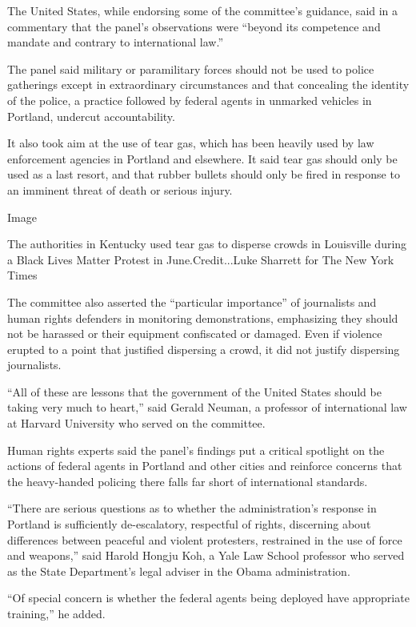 The United States, while endorsing some of the committee's guidance,
said in a commentary that the panel's observations were ``beyond its
competence and mandate and contrary to international law.''

The panel said military or paramilitary forces should not be used to
police gatherings except in extraordinary circumstances and that
concealing the identity of the police, a practice followed by federal
agents in unmarked vehicles in Portland, undercut accountability.

It also took aim at the use of tear gas, which has been heavily used by
law enforcement agencies in Portland and elsewhere. It said tear gas
should only be used as a last resort, and that rubber bullets should
only be fired in response to an imminent threat of death or serious
injury.

Image

The authorities in Kentucky used tear gas to disperse crowds in
Louisville during a Black Lives Matter Protest in June.Credit...Luke
Sharrett for The New York Times

The committee also asserted the ``particular importance'' of journalists
and human rights defenders in monitoring demonstrations, emphasizing
they should not be harassed or their equipment confiscated or damaged.
Even if violence erupted to a point that justified dispersing a crowd,
it did not justify dispersing journalists.

``All of these are lessons that the government of the United States
should be taking very much to heart,'' said Gerald Neuman, a professor
of international law at Harvard University who served on the committee.

Human rights experts said the panel's findings put a critical spotlight
on the actions of federal agents in Portland and other cities and
reinforce concerns that the heavy-handed policing there falls far short
of international standards.

``There are serious questions as to whether the administration's
response in Portland is sufficiently de-escalatory, respectful of
rights, discerning about differences between peaceful and violent
protesters, restrained in the use of force and weapons,'' said Harold
Hongju Koh, a Yale Law School professor who served as the State
Department's legal adviser in the Obama administration.

``Of special concern is whether the federal agents being deployed have
appropriate training,'' he added.

